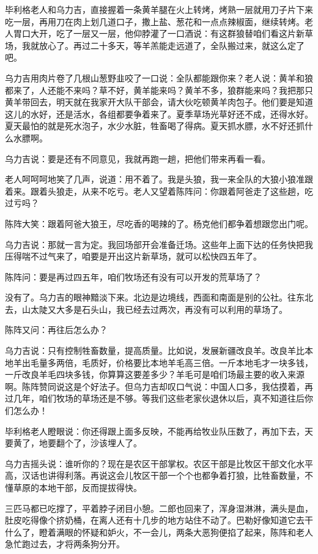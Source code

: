 \par 毕利格老人和乌力吉，直接握着一条黄羊腿在火上转烤，烤熟一层就用刀子片下来吃一层，再用刀在肉上划几道口子，撒上盐、葱花和一点点辣椒面，继续转烤。老人胃口大开，吃了一层又一层，他仰脖灌了一口酒说：有这群狼替咱们看这片新草场，我就放心了。再过二十多天，等羊羔能走远道了，全队搬过来，就这么定了吧。
\par 乌力吉用肉片卷了几根山葱野韭咬了一口说：全队都能跟你来？老人说：黄羊和狼都来了，人还能不来吗？草不好，黄羊能来吗？黄羊不多，狼群能来吗？我把那只黄羊带回去，明天就在我家开大队干部会，请大伙吃顿黄羊肉包子。他们要是知道这儿的水好，还是活水，各组都要争着来了。夏季草场光草好还不成，还得水好。夏天最怕的就是死水泡子，水少水脏，牲畜喝了得病。夏天抓水膘，水不好还抓什么水膘啊。
\par 乌力吉说：要是还有不同意见，我就再跑一趟，把他们带来再看一看。
\par 老人呵呵呵地笑了几声，说道：用不着了。我是头狼，我一来全队的大狼小狼准跟着来。跟着头狼走，从来不吃亏。老人又望着陈阵问：你跟着阿爸走了这些趟，吃过亏吗？
\par 陈阵大笑：跟着阿爸大狼王，尽吃香的喝辣的了。杨克他们都争着想跟您出门呢。
\par 乌力吉说：那就一言为定。我回场部开会准备迁场。这些年上面下达的任务快把我压得喘不过气来了，咱要是开出这片新草场，就可以松快四五年了。
\par 陈阵问：要是再过四五年，咱们牧场还有没有可以开发的荒草场了？
\par 没有了。乌力吉的眼神黯淡下来。北边是边境线，西面和南面是别的公社。往东北去，山太陡又大多是石头山，我已经去过两次，再没有可以利用的草场了。
\par 陈阵又问：再往后怎么办？
\par 乌力吉说：只有控制牲畜数量，提高质量。比如说，发展新疆改良羊。改良羊比本地羊出毛量多两倍，毛质好，价格要比本地羊毛高三倍。一斤本地毛才一块多钱，一斤改良羊毛四块多钱，你算算这要差多少？羊毛可是咱们场最主要的收入来源啊。陈阵赞同说这是个好法子。但乌力吉却叹口气说：中国人口多，我估摸着，再过几年，咱们牧场的草场还是不够。等我们这些老家伙退休以后，真不知道往后你们怎么办！
\par 毕利格老人瞪眼说：你还得跟上面多反映，不能再给牧业队压数了，再加下去，天要黄了，地要翻个了，沙该埋人了。
\par 乌力吉摇头说：谁听你的？现在是农区干部掌权。农区干部是比牧区干部文化水平高，汉话也讲得利落。再说这会儿牧区干部一个个也都争着打狼，比牲畜数量，不懂草原的本地干部，反而提拔得快。
\par 三匹马都已吃撑了，平着脖子闭目小憩。二郎也回来了，浑身湿淋淋，满头是血，肚皮吃得像个挤奶桶，在离人还有十几步的地方站住不动了。巴勒好像知道它去干什么了，瞪着满眼的怀疑和妒火，不一会儿，两条大恶狗便掐了起来，陈阵和老人急忙跑过去，才将两条狗分开。
